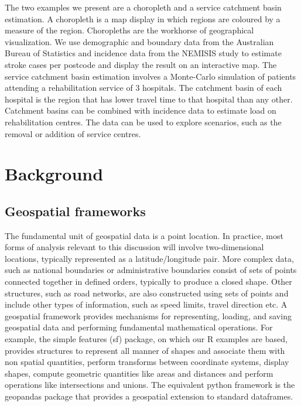 \documentclass[utf8]{frontiersHLTH}
\begin{document}
The two examples we present are a choropleth and a service catchment
basin estimation. A choropleth is a map display in which regions are
coloured by a measure of the region. Choropleths are the workhorse of
geographical visualization. We use demographic and boundary data from
the Australian Bureau of Statistics and incidence data from the
NEMISIS \cite{thrift_stroke_2000,azarpazhooh2008patterns} study to
estimate stroke cases per postcode and display the result on an
interactive map. The service catchment basin estimation involves a
Monte-Carlo simulation of patients attending a rehabilitation service
of 3 hospitals. The catchment basin of each hospital is the region
that has lower travel time to that hospital than any other.  Catchment
basins can be combined with incidence data to estimate load on
rehabilitation centres. The data can be used to explore scenarios,
such as the removal or addition of service centres.

\section{Background}\label{background}

\subsection{Geospatial frameworks}\label{geospatial-frameworks}

The fundamental unit of geospatial data is a point location. In
practice, most forms of analysis relevant to this discussion will
involve two-dimensional locations, typically represented as a
latitude/longitude pair. More complex data, such as national boundaries
or administrative boundaries consist of sets of points connected
together in defined orders, typically to produce a closed shape. Other
structures, such as road networks, are also constructed using sets of
points and include other types of information, such as speed limits,
travel direction etc. A geospatial framework provides mechanisms for
representing, loading, and saving geospatial data and performing
fundamental mathematical operations. For example, the simple features
(sf) \cite{Pebesma_2018} package, on which our R examples are based,
provides structures to represent all manner of shapes and associate them
with non spatial quantities, perform transforms between coordinate
systems, display shapes, compute geometric quantities like areas and
distances and perform operations like intersections and unions. The
equivalent python framework is the geopandas package that provides a
geospatial extension to standard dataframes.
\end{document}
